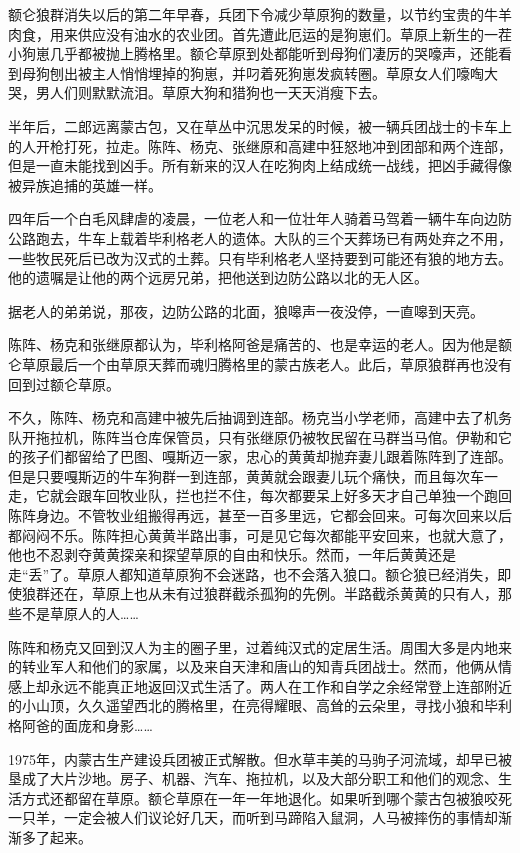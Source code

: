 \par 额仑狼群消失以后的第二年早春，兵团下令减少草原狗的数量，以节约宝贵的牛羊肉食，用来供应没有油水的农业团。首先遭此厄运的是狗崽们。草原上新生的一茬小狗崽几乎都被抛上腾格里。额仑草原到处都能听到母狗们凄厉的哭嚎声，还能看到母狗刨出被主人悄悄埋掉的狗崽，并叼着死狗崽发疯转圈。草原女人们嚎啕大哭，男人们则默默流泪。草原大狗和猎狗也一天天消瘦下去。
\par 半年后，二郎远离蒙古包，又在草丛中沉思发呆的时候，被一辆兵团战士的卡车上的人开枪打死，拉走。陈阵、杨克、张继原和高建中狂怒地冲到团部和两个连部，但是一直未能找到凶手。所有新来的汉人在吃狗肉上结成统一战线，把凶手藏得像被异族追捕的英雄一样。
\par 四年后一个白毛风肆虐的凌晨，一位老人和一位壮年人骑着马驾着一辆牛车向边防公路跑去，牛车上载着毕利格老人的遗体。大队的三个天葬场已有两处弃之不用，一些牧民死后已改为汉式的土葬。只有毕利格老人坚持要到可能还有狼的地方去。他的遗嘱是让他的两个远房兄弟，把他送到边防公路以北的无人区。
\par 据老人的弟弟说，那夜，边防公路的北面，狼嗥声一夜没停，一直嗥到天亮。
\par 陈阵、杨克和张继原都认为，毕利格阿爸是痛苦的、也是幸运的老人。因为他是额仑草原最后一个由草原天葬而魂归腾格里的蒙古族老人。此后，草原狼群再也没有回到过额仑草原。
\par 不久，陈阵、杨克和高建中被先后抽调到连部。杨克当小学老师，高建中去了机务队开拖拉机，陈阵当仓库保管员，只有张继原仍被牧民留在马群当马倌。伊勒和它的孩子们都留给了巴图、嘎斯迈一家，忠心的黄黄却抛弃妻儿跟着陈阵到了连部。但是只要嘎斯迈的牛车狗群一到连部，黄黄就会跟妻儿玩个痛快，而且每次车一走，它就会跟车回牧业队，拦也拦不住，每次都要呆上好多天才自己单独一个跑回陈阵身边。不管牧业组搬得再远，甚至一百多里远，它都会回来。可每次回来以后都闷闷不乐。陈阵担心黄黄半路出事，可是见它每次都能平安回来，也就大意了，他也不忍剥夺黄黄探亲和探望草原的自由和快乐。然而，一年后黄黄还是走“丢”了。草原人都知道草原狗不会迷路，也不会落入狼口。额仑狼已经消失，即使狼群还在，草原上也从未有过狼群截杀孤狗的先例。半路截杀黄黄的只有人，那些不是草原人的人……
\par 陈阵和杨克又回到汉人为主的圈子里，过着纯汉式的定居生活。周围大多是内地来的转业军人和他们的家属，以及来自天津和唐山的知青兵团战士。然而，他俩从情感上却永远不能真正地返回汉式生活了。两人在工作和自学之余经常登上连部附近的小山顶，久久遥望西北的腾格里，在亮得耀眼、高耸的云朵里，寻找小狼和毕利格阿爸的面庞和身影……
\par 1975年，内蒙古生产建设兵团被正式解散。但水草丰美的马驹子河流域，却早已被垦成了大片沙地。房子、机器、汽车、拖拉机，以及大部分职工和他们的观念、生活方式还都留在草原。额仑草原在一年一年地退化。如果听到哪个蒙古包被狼咬死一只羊，一定会被人们议论好几天，而听到马蹄陷入鼠洞，人马被摔伤的事情却渐渐多了起来。

